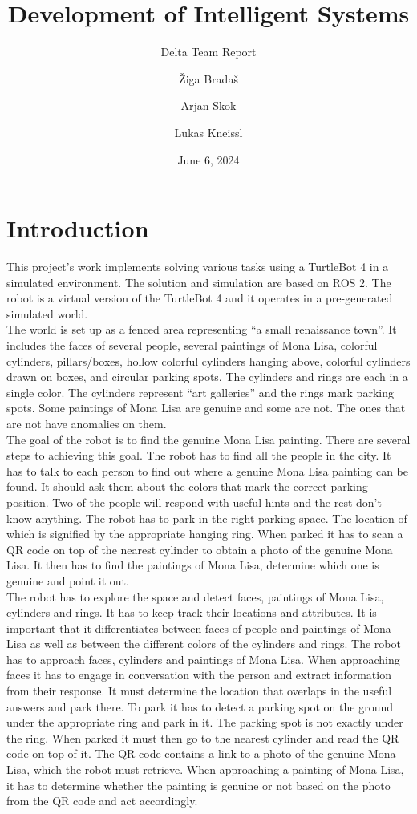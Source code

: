 \documentclass[a4paper,
  twoside, %
  headlines=2.1 %
  ]{scrartcl}
\author{Žiga Bradaš \\ \and Arjan Skok \\ \and Lukas Kneissl}
\title{Development of Intelligent Systems}
\subtitle{Delta Team Report}
\date{June 6, 2024}
\begin{document}
\maketitle

\newpage

\tableofcontents

\newpage

\section{Introduction}
This project’s work implements solving various tasks using a TurtleBot 4 in a simulated environment. The solution and simulation are based on ROS 2. The robot is a virtual version of the TurtleBot 4 and it operates in a pre-generated simulated world.
\\
The world is set up as a fenced area representing “a small renaissance town”. It includes the faces of several people, several paintings of Mona Lisa, colorful cylinders, pillars/boxes, hollow colorful cylinders hanging above, colorful cylinders drawn on boxes, and circular parking spots. The cylinders and rings are each in a single color. The cylinders represent “art galleries” and the rings mark parking spots. Some paintings of Mona Lisa are genuine and some are not. The ones that are not have anomalies on them. 
\\
The goal of the robot is to find the genuine Mona Lisa painting. There are several steps to achieving this goal. The robot has to find all the people in the city. It has to talk to each person to find out where a genuine Mona Lisa painting can be found. It should ask them about the colors that mark the correct parking position. Two of the people will respond with useful hints and the rest don’t know anything. The robot has to park in the right parking space. The location of which is signified by the appropriate hanging ring. When parked it has to scan a QR code on top of the nearest cylinder to obtain a photo of the genuine Mona Lisa. It then has to find the paintings of Mona Lisa, determine which one is genuine and point it out. 
\\
The robot has to explore the space and detect faces, paintings of Mona Lisa, cylinders and rings. It has to keep track their locations and attributes. It is important that it differentiates between faces of people and paintings of Mona Lisa as well as between the different colors of the cylinders and rings. The robot has to approach faces, cylinders and paintings of Mona Lisa. When approaching faces it has to engage in conversation with the person and extract information from their response. It must determine the location that overlaps in the useful answers and park there. To park it has to detect a parking spot on the ground under the appropriate ring and park in it. The parking spot is not exactly under the ring. When parked it must then go to the nearest cylinder and read the QR code on top of it. The QR code contains a link to a photo of the genuine Mona Lisa, which the robot must retrieve. When approaching a painting of Mona Lisa, it has to determine whether the painting is genuine or not based on the photo from the QR code and act accordingly. 
\end{document}
